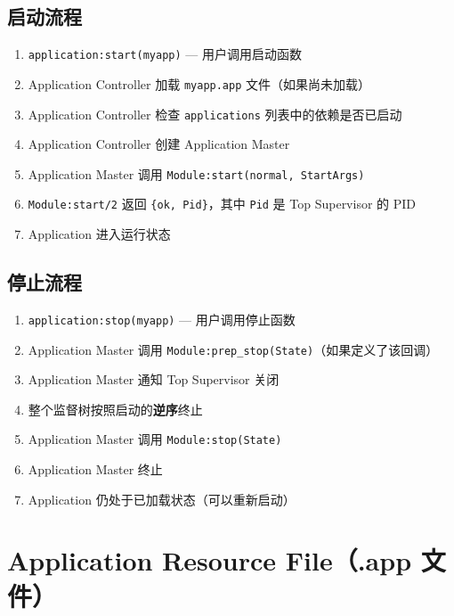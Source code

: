 \documentclass[a4paper,11pt]{article}
\begin{document}
\subsection{启动流程}

\begin{enumerate}[leftmargin=2em]
    \item \texttt{application:start(myapp)} --- 用户调用启动函数
    \item Application Controller 加载 \texttt{myapp.app} 文件（如果尚未加载）
    \item Application Controller 检查 \texttt{applications} 列表中的依赖是否已启动
    \item Application Controller 创建 Application Master
    \item Application Master 调用 \texttt{Module:start(normal, StartArgs)}
    \item \texttt{Module:start/2} 返回 \texttt{\{ok, Pid\}}，其中 \texttt{Pid} 是 Top Supervisor 的 PID
    \item Application 进入运行状态
\end{enumerate}

\subsection{停止流程}

\begin{enumerate}[leftmargin=2em]
    \item \texttt{application:stop(myapp)} --- 用户调用停止函数
    \item Application Master 调用 \texttt{Module:prep\_stop(State)}（如果定义了该回调）
    \item Application Master 通知 Top Supervisor 关闭
    \item 整个监督树按照启动的\textbf{逆序}终止
    \item Application Master 调用 \texttt{Module:stop(State)}
    \item Application Master 终止
    \item Application 仍处于已加载状态（可以重新启动）
\end{enumerate}


\section{Application Resource File（.app 文件）}
\end{document}

